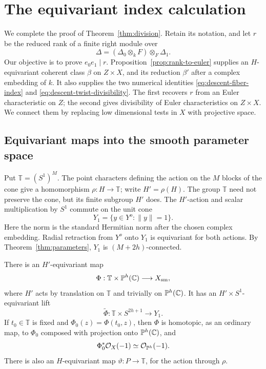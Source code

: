 \section{The equivariant index calculation}\label{sec:index}

We complete the proof of Theorem~\ref{thm:division}.  Retain its notation,
and let \(r\) be the reduced rank of a finite right module over
\[
 \Delta=(\Delta _0\otimes_k F)\otimes_F\Delta _1.
\]
Our objective is to prove \(e_0e_1\mid r\).
Proposition~\ref{prop:rank-to-euler} supplies an \(H\)-equivariant coherent
class \(\beta\) on \(Z\times X\), and its reduction \(\beta'\) after a
complex embedding of \(k\).  It also supplies the two numerical
identities \eqref{eq:descent-fiber-index} and
\eqref{eq:descent-twist-divisibility}.  The first recovers \(r\) from an
Euler characteristic on \(Z\); the second gives divisibility of Euler
characteristics on \(Z\times X\).  We connect them by replacing low
dimensional tests in \(X\) with projective space.

\subsection{Equivariant maps into the smooth parameter space}

Put \(\mathbb T=(S^1)^M\).  The point characters defining the action on
the \(M\) blocks of the cone give a homomorphism
\(\rho:H\longrightarrow\mathbb T\); write \(H'=\rho(H)\).
The group \(\mathbb T\) need not preserve the cone, but its finite
subgroup \(H'\) does.  The \(H'\)-action and scalar multiplication by
\(S^1\) commute on the unit cone
\[
 Y_1=\{y\in Y^o:\|y\|=1\}.
\]
Here the norm is the standard Hermitian norm after the chosen complex
embedding.  Radial retraction from \(Y^o\) onto \(Y_1\) is equivariant
for both actions.  By Theorem~\ref{thm:parameters}, \(Y_1\) is
\((M+2h)\)-connected.

\begin{lemma}\label{lem:index-equivariant-map}
There is an \(H'\)-equivariant map
\[
 \Phi:\mathbb T\times\mathbb P^h(\mathbb C)\longrightarrow X_{\mathrm{sm}},
\]
where \(H'\) acts by translation on \(\mathbb T\) and trivially on
\(\mathbb P^h(\mathbb C)\).  It has an \(H'\times S^1\)-equivariant lift
\[
 \widetilde\Phi:\mathbb T\times S^{2h+1}\longrightarrow Y_1.
\]
If \(t_0\in\mathbb T\) is fixed and \(\Phi_0(z)=\Phi(t_0,z)\), then \(\Phi\)
is homotopic, as an ordinary map, to \(\Phi_0\) composed with projection
onto \(\mathbb P^h(\mathbb C)\), and
\[
 \Phi_0^*\mathcal O_X(-1)\simeq\mathcal O_{\mathbb P^h}(-1).
\]
There is also an \(H\)-equivariant map
\(\vartheta:P\longrightarrow\mathbb T\), for the action through \(\rho\).
\end{lemma}

